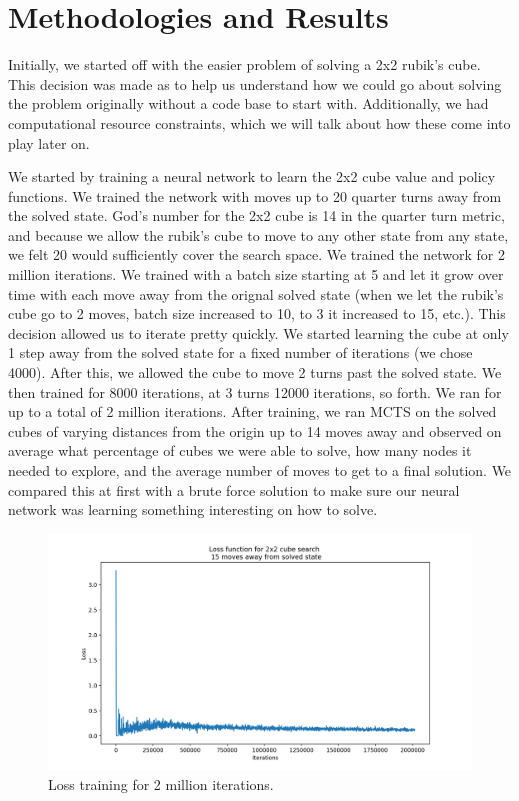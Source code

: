 \documentclass[10pt,twocolumn,letterpaper]{article}
\begin{document}
\section{Methodologies and Results}

Initially, we started off with the easier problem of solving a 2x2 rubik's cube. This decision was made as to help us understand how we could go about solving the problem originally without a code base to start with. Additionally, we had computational resource constraints, which we will talk about how these come into play later on.

We started by training a neural network to learn the 2x2 cube value and policy functions. We trained the network with moves up to 20 quarter turns away from the solved state. God's number for the 2x2 cube is 14 in the quarter turn metric, and because we allow the rubik's cube to move to any other state from any state, we felt 20 would sufficiently cover the search space. We trained the network for 2 million iterations. We trained with a batch size starting at 5 and let it grow over time with each move away from the orignal solved state (when we let the rubik's cube go to 2 moves, batch size increased to 10, to 3 it increased to 15, etc.). This decision allowed us to iterate pretty quickly.  We started learning the cube at only 1 step away from the solved state for a fixed number of iterations (we chose 4000). After this, we allowed the cube to move 2 turns past the solved state. We then trained for 8000 iterations, at 3 turns 12000 iterations, so forth. We ran for up to a total of 2 million iterations. After training, we ran MCTS on the solved cubes of varying distances from the origin up to 14 moves away and observed on average what percentage of cubes we were able to solve, how many nodes it needed to explore, and the average number of moves to get to a final solution. We compared this at first with a brute force solution to make sure our neural network was learning something interesting on how to solve. 



\begin{figure}
  \includegraphics[width=\linewidth]{loss.png}
  \caption{Loss training for 2 million iterations.}
  \label{fig:net}
\end{figure}
\end{document}
